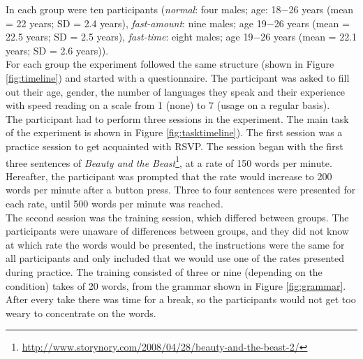 \noindent In each group were ten participants (\textit{normal}: four males; age: 18$-$26 years (mean = 22 years; SD = 2.4 years), \textit{fast-amount}: nine males; age 19$-$26 years (mean = 22.5 years; SD = 2.5 years), \textit{fast-time}: eight males; age 19$-$26 years (mean = 22.1 years; SD = 2.6 years)).\\
For each group the experiment followed the same structure (shown in Figure \ref{fig:timeline}) and started with a questionnaire. The participant was asked to fill out their age, gender, the number of languages they speak and their experience with speed reading on a scale from 1 (none) to 7 (usage on a regular basis). \\
The participant had to perform three sessions in the experiment. The main task of the experiment is shown in Figure \ref{fig:tasktimeline}). The first session was a practice session to get acquainted with RSVP. The session began with the first three sentences of \textit{Beauty and the Beast}\footnote{\url{http://www.storynory.com/2008/04/28/beauty-and-the-beast-2/}}, at a rate of 150 words per minute. Hereafter, the participant was prompted that the rate would increase to 200 words per minute after a button press. Three to four sentences were presented for each rate, until 500 words per minute was reached.\\
The second session was the training session, which differed between groups. The participants were unaware of differences between groups, and they did not know at which rate the words would be presented, the instructions were the same for all participants and only included that we would use one of the rates presented during practice. The training consisted of three or nine (depending on the condition) takes of 20 words, from the grammar shown in Figure \ref{fig:grammar}. After every take there was time for a break, so the participants would not get too weary to concentrate on the words.

